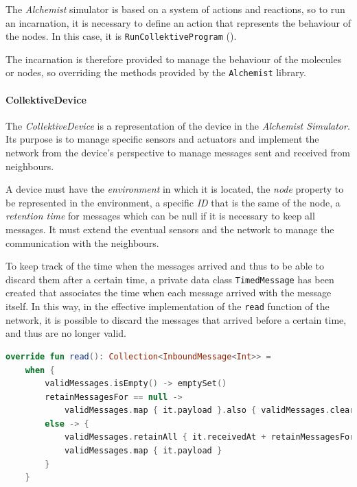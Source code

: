 The \emph{Alchemist} simulator is based on a system of actions and reactions, so to run an incarnation, it is necessary
to define an action that represents the behaviour of the nodes.
In this case, it is \texttt{RunCollektiveProgram} ().

The incarnation is therefore provided to manage the behaviour of the molecules or nodes, so overriding the methods
provided by the \texttt{Alchemist} library.

\paragraph{CollektiveDevice}
The \emph{CollektiveDevice} is a representation of the device in the \emph{Alchemist Simulator}.
Its purpose is to manage specific sensors and actuators and implement the network from the device's perspective to
manage messages sent and received from neighbours.

A device must have the \emph{environment} in which it is located, the \emph{node} property to be represented in the environment,
a specific \emph{ID} that is the same of the node, a \emph{retention time} for messages which can be null if it is necessary
to keep all messages.
It must extend the eventual sensors and the network to manage the communication with the neighbours.

To keep track of the time when the messages arrived and thus to be able to discard them after a certain time,
a private data class \texttt{TimedMessage} has been created that associates the time when each message arrived with the message itself.
In this way, in the effective implementation of the \texttt{read} function of the network, it is possible
to discard the messages that arrived before a certain time, and thus are no longer valid.

\begin{lstlisting}[language=kt,label={lst:read},caption={The implementation of the \texttt{read} function of the \texttt{Network}.}]
override fun read(): Collection<InboundMessage<Int>> =
    when {
        validMessages.isEmpty() -> emptySet()
        retainMessagesFor == null ->
            validMessages.map { it.payload }.also { validMessages.clear() }
        else -> {
            validMessages.retainAll { it.receivedAt + retainMessagesFor >= currentTime }
            validMessages.map { it.payload }
        }
    }
\end{lstlisting}

